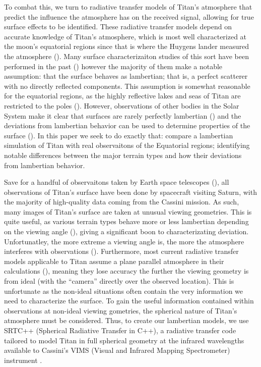 \documentclass[twocolumn,linenumbers]{aastex631}
\begin{document}
To combat this, we turn to radiative transfer models of Titan's atmosphere that predict the influence the atmosphere has on the received signal, allowing for true surface effects to be identified. These radiative transfer models depend on accurate knowledge of Titan's atmosphere, which is most well characterized at the moon's equatorial regions since that is where the Huygens lander measured the atmosphere (). Many surface characterizaiton studies of this sort have been performed in the past () however the majority of them make a notable assumption: that the surface behaves as lambertian; that is, a perfect scatterer with no directly reflected components. This assumption is somewhat reasonable for the equatorial regions, as the highly reflective lakes and seas of Titan are restricted to the poles (). However, observations of other bodies in the Solar System make it clear that surfaces are rarely perfectly lambertian () and the deviations from lambertian behavior can be used to determine properties of the surface (). In this paper we seek to do exactly that: compare a lambertian simulation of Titan with real observaitons of the Equatorial regions; identifying notable differences between the major terrain types and how their deviations from lambertian behavior.

Save for a handful of observaitons taken by Earth space telescopes (), all observations of Titan's surface have been done by spacecraft visiting Saturn, with the majority of high-quality data coming from the Cassini mission. As such, many images of Titan's surface are taken at unusual viewing geometries. This is quite useful, as various terrain types behave more or less lambertian depending on the viewing angle (), giving a significant boon to characterizating deviation. Unfortunatley, the more extreme a viewing angle is, the more the atmosphere interferes with observations (). Furthermore, most current radiative transfer models applicable to Titan assume a plane parallel atmosphere in their calculations (), meaning they lose accuracy the further the viewing geometry is from ideal (with the ``camera'' directly over the observed location). This is unfortunate as the non-ideal situations often contain the very information we need to characterize the surface. To gain the useful information contained within observations at non-ideal viewing gometries, the spherical nature of Titan's atmosphere must be considered. Thus, to create our lambertian models, we use SRTC++ (Spherical Radiative Transfer in C++), a radiative transfer code tailored to model Titan in full spherical geometry at the infrared wavelengths available to Cassini's VIMS (Visual and Infrared Mapping Spectrometer) instrument \citep{Barnes2018}.  
\end{document}
